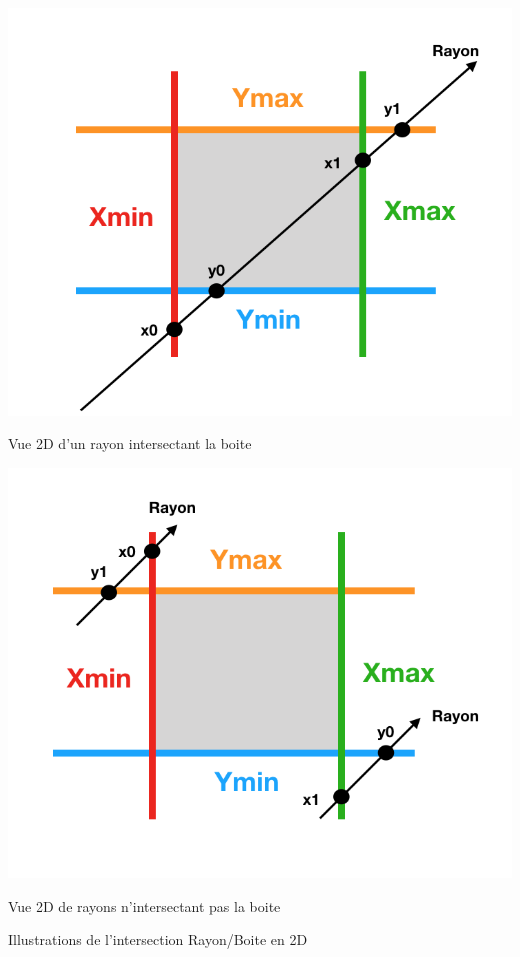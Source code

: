 \begin{figureth}
	\begin{subfigureth}{0.45\textwidth}
		\includegraphics[width=\linewidth]{images/AABB}
		\caption{Vue 2D d'un rayon intersectant la boite}
		\label{AABB}
	\end{subfigureth}
	\qquad
	\begin{subfigureth}{0.45\textwidth}
		\includegraphics[width=\linewidth]{images/AABB2}
		\caption{Vue 2D de rayons n'intersectant pas la boite}
		\label{AABB2}
	\end{subfigureth}
	\caption{Illustrations de l'intersection Rayon/Boite en 2D}
\end{figureth}

